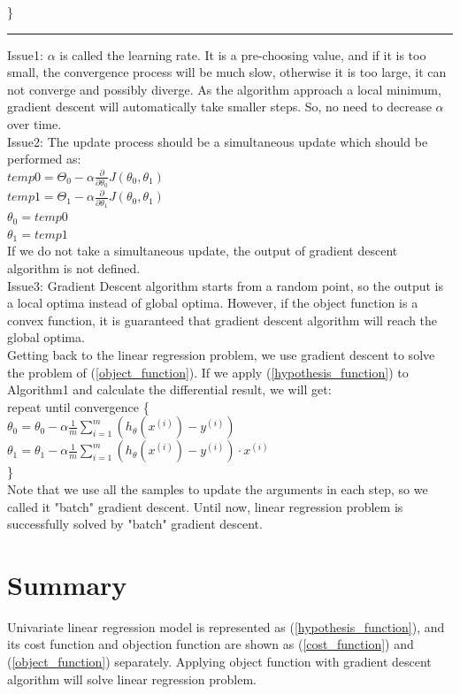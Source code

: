 \documentclass{article}
\begin{document}
\}
\smallskip
\hrule
\medskip
\noindent Issue1: $\alpha$ is called the learning rate. It is a pre-choosing value, and if it is too small, the convergence process will be much slow, otherwise it is too large, it can not converge and possibly diverge. As the algorithm approach a local minimum, gradient descent will automatically take smaller steps. So, no need to decrease $\alpha$ over time.\\
Issue2: The update process should be a simultaneous update which should be performed as:\\
$temp0=\Theta_0 - \alpha\frac{\partial}{\partial \theta_0}J(\theta_0, \theta_1)$\\
$temp1=\Theta_1 - \alpha\frac{\partial}{\partial \theta_1}J(\theta_0, \theta_1)$\\
$\theta_0 = temp0$\\
$\theta_1 = temp1$\\
If we do not take a simultaneous update, the output of gradient descent algorithm is not defined.\\
Issue3: Gradient Descent algorithm starts from a random point, so the output is a local optima instead of global optima. However, if the object function is a convex function, it is guaranteed that gradient descent algorithm will reach the global optima.\\
Getting back to the linear regression problem, we use gradient descent to solve the problem of (\ref{object_function}). If we apply (\ref{hypothesis_function}) to Algorithm1 and calculate the differential result, we will get:\\
repeat until convergence \{\\
$\theta_0=\theta_0 - \alpha \frac{1}{m} \sum_{i=1}^{m}(h_\theta(x^{(i)})-y^{(i)})$\\
$\theta_1=\theta_1 - \alpha \frac{1}{m} \sum_{i=1}^{m}(h_\theta(x^{(i)})-y^{(i)}) \cdot x^{(i)}$\\
\}\\
Note that we use all the samples to update the arguments in each step, so we called it "batch" gradient descent. Until now, linear regression problem is successfully solved by "batch" gradient descent.

\section{Summary}
Univariate linear regression model is represented as (\ref{hypothesis_function}), and its cost function and objection function are shown as (\ref{cost_function}) and (\ref{object_function}) separately. Applying object function with gradient descent algorithm will solve linear regression problem.
\end{document}
